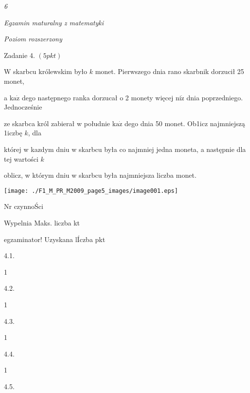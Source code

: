 \documentclass[a4paper,12pt]{article}
\begin{document}
{\it 6}

{\it Egzamin maturalny z matematyki}

{\it Poziom rozszerzony}

Zadanie 4. $(5pkt)$

$\mathrm{W}$ skarbcu królewskim było $k$ monet. Pierwszego dnia rano skarbnik dorzucił 25 monet,

a $\mathrm{k}\mathrm{a}\dot{\mathrm{z}}$ dego następnego ranka dorzucał o 2 monety więcej $\mathrm{n}\mathrm{i}\dot{\mathrm{z}}$ dnia poprzedniego. Jednocześnie

ze skarbca król zabierał w południe $\mathrm{k}\mathrm{a}\dot{\mathrm{z}}$ dego dnia 50 monet. Ob1icz najmniejszą 1iczbę $k$, dla

której w kazdym dniu w skarbcu była co najmniej jedna moneta, a następnie dla tej wartości $k$

oblicz, w którym dniu w skarbcu była najmniejsza liczba monet.
\begin{center}
\texttt{[image: ./F1\_M\_PR\_M2009\_page5\_images/image001.eps]}
\end{center}
Nr czynnoŚci

Wypelnia Maks. liczba kt

egzaminator! Uzyskana lÍczba pkt

4.1.

1

4.2.

1

4.3.

1

4.4.

1

4.5.
\end{document}
